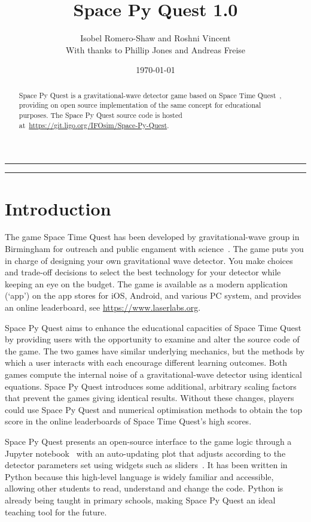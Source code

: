 \documentclass{article}
\title{Space Py Quest 1.0}
\author{Isobel Romero-Shaw and Roshni Vincent \\
{\small With thanks to Phillip Jones and Andreas Freise}}
\date{\today}
\makeatletter
\renewcommand\tableofcontents{%
\@starttoc{toc}%
}
\makeatother
\begin{document}
\maketitle

\vspace{1cm}
\begin{abstract}
\noindent
Space Py Quest is a gravitational-wave detector game based on
Space Time Quest~\cite{stq}, providing on open source implementation
of the same concept for educational purposes.
The Space Py Quest source code is
hosted  at~\url{https://git.ligo.org/IFOsim/Space-Py-Quest}.
\end{abstract}
\vspace{5mm}
\vfill
\hrule
\tableofcontents
\vspace{3mm}
\hrule
\clearpage

\section{Introduction}
\label{sec:introduction}

The game Space Time Quest has been developed by
gravitational-wave group in Birmingham for outreach and public
engament with science~\cite{carbone12b}.
The game puts you in charge of designing your own gravitational wave
detector. You make choices and trade-off decisions to select the best
technology for your detector while keeping an eye on the budget. 
The game is available as a modern application (`app') on the app
stores for iOS, Android, and various PC system, and provides
an online leaderboard, see \url{https://www.laserlabs.org}.

Space Py Quest aims to enhance the educational
capacities of Space Time Quest by providing users with the opportunity
to examine and alter the source code of the game. The two games have similar
underlying mechanics, but the methods by which a user interacts with
each encourage different learning outcomes. 
Both games compute the internal noise of a gravitational-wave detector
using identical equations. Space Py Quest introduces some additional,
arbitrary scaling factors that prevent the games giving
identical results. Without these changes, players could use Space Py
Quest and numerical optimisation methods to obtain the top score
in the online leaderboards of Space Time Quest's high scores.

Space Py Quest presents an open-source interface to the game logic
through a Jupyter notebook~\cite{jupyter} with an
auto-updating plot that adjusts according to the detector parameters
set using widgets such as sliders~\cite{ipy}. It has been written in Python
because this high-level language is widely familiar and accessible,
allowing other students to read, understand and change the
code. Python is already being taught in primary schools, making
Space Py Quest an ideal teaching tool for the future.
\end{document}
